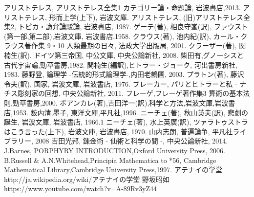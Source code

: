 \documentclass[b5j,8pt,twocolumn]{ltjsarticle}
\begin{document}
\begin{thebibliography}{99}
アリストテレス, アリストテレス全集1 カテゴリー論・命題論, 岩波書店,2013.
アリストテレス, 形而上学(上下), 岩波文庫.
アリストテレス, (旧)アリストテレス全集2, トピカ・詭弁論駁論, 岩波書店, 1987.
ゲーテ(著), 相良守峯(訳), ファウスト(第一部,第二部),岩波文庫, 岩波書店,1958.
クラウス(著), 池内紀(訳), 
カール・クラウス著作集 9・10 人類最期の日々, 法政大学出版局, 2001.
クラーザー(著), 関楠生(訳), ドイツ第三帝国, 中公文庫, 中央公論新社, 2008.
柴田有,グノーシスと古代宇宙論,勁草書房,1982.
関楠生(編訳),ヒトラー・ジョーク, 河出書房新社, 1983.
藤野登, 論理学 -伝統的形式論理学-,内田老鶴圃, 2003.
プラトン(著), 藤沢 令夫(訳), 国家, 岩波文庫, 岩波書店, 1976.
ブレーカー, パリとヒトラーと私 - ナチス彫刻家の回想, 中央公論新社, 2011.
フレーゲ,フレーゲ著作集3 算術の基本法則,勁草書房,2000.
ポアンカレ(著),吉田洋一(訳),科学と方法,岩波文庫,岩波書店,1953. 
薮内清,墨子, 東洋文庫,平凡社,1996.
ニーチェ(著), 秋山英夫(訳), 悲劇の誕生, 岩波文庫, 岩波書店, 1966.1
ニーチェ(著), 水上英廣(訳), ツァラトゥストラはこう言った(上下), 
岩波文庫, 岩波書店, 1970.
山内志朗, 普遍論争, 平凡社ライブラリー, 2008
吉田光邦, 錬金術 - 仙術と科学の間 -, 中央公論新社, 2014.
J.Barnes, PORPHYRY INTRODUCTION,Oxford University Press, 2006.
B.Russell \& A.N.Whitehead,Principia Mathematica to *56,
Cambridge Mathematical Library,Cambridge University Press,1997.
アテナイの学堂 
http://ja.wikipedia.org/wiki/アテナイの学堂
野坂昭如
https://www.youtube.com/watch?v=A-89Rv3yZ44
\end{thebibliography}
\end{document}
